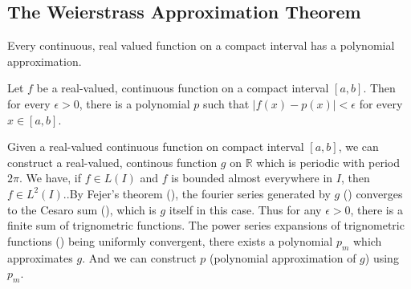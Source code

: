 \subsection{The Weierstrass Approximation Theorem}
	Every continuous, real valued function on a compact interval has a polynomial approximation.\cite[Theorem 11.17]{apostol}

\begin{theorem}[Weierstrass]
	Let $f$ be a real-valued, continuous function on a compact interval $[a,b]$. Then for every \(\epsilon > 0\), there is a polynomial $p$ such that \(|f(x)-p(x)| < \epsilon\) for every \(x \in [a,b]\).
\end{theorem}
\begin{synopsis}
	Given a real-valued continuous function on compact interval $[a,b]$, we can construct a real-valued, continous function $g$ on $\mathbb{R}$ which is periodic with period $2\pi$. We have, if \(f \in L(I)\) and $f$ is bounded almost everywhere in $I$, then \(f \in L^2(I)\).\cite[Theorem 10.52]{apostol}.By Fejer's theorem (\cite[Theorem 11.15]{apostol}), the fourier series generated by $g$ (\cite[definition 11.3]{apostol}) converges to the Cesaro sum (\cite[Definition 8.47]{apostol}), which is $g$ itself in this case. Thus for any \(\epsilon > 0\), there is a finite sum of trignometric functions. The power series expansions of trignometric functions (\cite[definition 9.27]{apostol}) being uniformly convergent, there exists a polynomial $p_m$ which approximates $g$. And we can construct $p$ (polynomial approximation of $g$) using $p_m$.
\end{synopsis}
